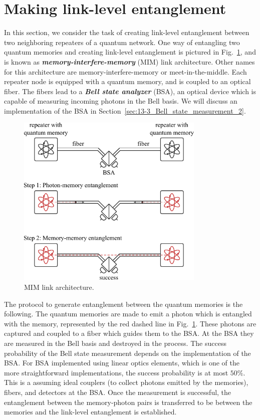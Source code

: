 \section{Making link-level entanglement}
\label{sec:12-2_making_link_level_rantanglement}

In this section, we consider the task of creating link-level entanglement between two neighboring repeaters of a quantum network.
One way of entangling two quantum memories and creating link-level entanglement is pictured in Fig.~\ref{fig:12-2_MIM}, and is known as \textit{\textbf{memory-interfere-memory}} (MIM) link architecture.
Other names for this architecture are memory-interfere-memory or meet-in-the-middle.
Each repeater node is equipped with a quantum memory, and is coupled to an optical fiber.
The fibers lead to a \textit{\textbf{Bell state analyzer}} (BSA), an optical device which is capable of measuring incoming photons in the Bell basis.
We will discuss an implementation of the BSA in Section~\ref{sec:13-3_Bell_state_measurement_2}.

\begin{figure}[t]
    \centering
    \includegraphics[width=0.8\textwidth]{lesson12/12-2_MIM.pdf}
    \caption[MIM link architecture]{MIM link architecture.}
    \label{fig:12-2_MIM}
\end{figure}

The protocol to generate entanglement between the quantum memories is the following.
The quantum memories are made to emit a photon which is entangled with the memory, represented by the red dashed line in Fig.~\ref{fig:12-2_MIM}.
These photons are captured and coupled to a fiber which guides them to the BSA.
At the BSA they are measured in the Bell basis and destroyed in the process.
The success probability of the Bell state measurement depends on the implementation of the BSA.
For BSA implemented using linear optics elements, which is one of the more straightforward implementations, the success probability is at most $50\%$.
This is a assuming ideal couplers (to collect photons emitted by the memories), fibers, and detectors at the BSA.
Once the measurement is successful, the entanglement between the memory-photon pairs is transferred to be between the memories and the link-level entanglement is established.

